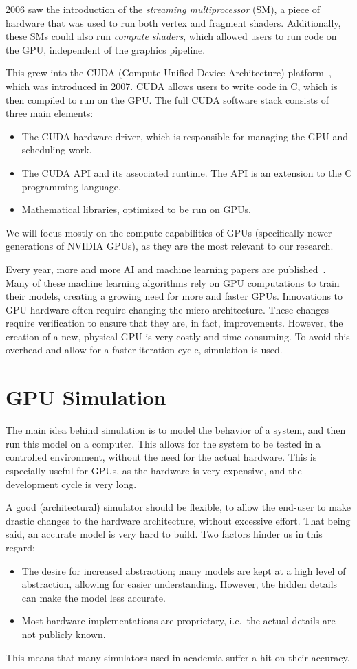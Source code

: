 2006 saw the introduction of the \textit{streaming multiprocessor} (SM), a piece of hardware that was used to run both vertex and fragment shaders.
Additionally, these SMs could also run \textit{compute shaders}, which allowed users to run code on the GPU, independent of the graphics pipeline.

This grew into the CUDA (Compute Unified Device Architecture) platform~\cite{cuda, cuda-prog}, which was introduced in 2007.
CUDA allows users to write code in C, which is then compiled to run on the GPU\@.
The full CUDA software stack consists of three main elements:
\begin{itemize}
    \item The CUDA hardware driver, which is responsible for managing the GPU and scheduling work.
    \item The CUDA API and its associated runtime.
    The API is an extension to the C programming language.
    \item Mathematical libraries, optimized to be run on GPUs.
\end{itemize}

We will focus mostly on the compute capabilities of GPUs (specifically newer generations of NVIDIA GPUs), as they are the most relevant to our research.

Every year, more and more AI and machine learning papers are published~\cite{aiindex}.
Many of these machine learning algorithms rely on GPU computations to train their models, creating a growing need for more and faster GPUs.
Innovations to GPU hardware often require changing the micro-architecture.
These changes require verification to ensure that they are, in fact, improvements.
However, the creation of a new, physical GPU is very costly and time-consuming.
To avoid this overhead and allow for a faster iteration cycle, simulation is used.

\section{GPU Simulation}\label{sec:simulation}
The main idea behind simulation is to model the behavior of a system, and then run this model on a computer.
This allows for the system to be tested in a controlled environment, without the need for the actual hardware.
This is especially useful for GPUs, as the hardware is very expensive, and the development cycle is very long.

A good (architectural) simulator should be flexible, to allow the end-user to make drastic changes to the hardware architecture, without excessive effort.
That being said, an accurate model is very hard to build.
Two factors hinder us in this regard:
\begin{itemize}
    \item The desire for increased abstraction; many models are kept at a high level of abstraction, allowing for easier understanding.
    However, the hidden details can make the model less accurate.
    \item Most hardware implementations are proprietary, i.e.\ the actual details are not publicly known.
\end{itemize}
This means that many simulators used in academia suffer a hit on their accuracy.

